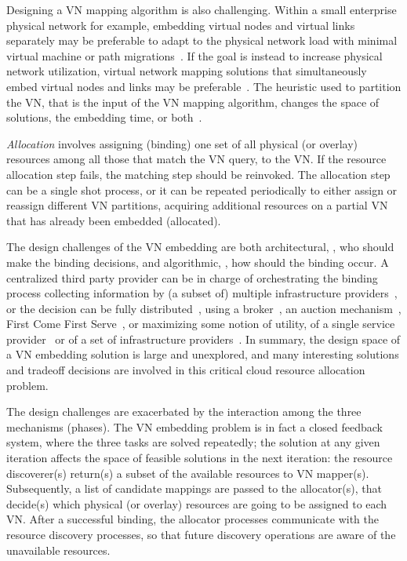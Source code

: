 \documentclass[a4paper, 10pt, conference]{ieeeconf}
\begin{document}
Designing a VN mapping algorithm is also challenging. Within a small enterprise physical network for example, embedding virtual nodes and virtual links separately may be preferable to adapt to the physical network load with minimal virtual machine or path migrations~\cite{pathsplitting}. If the goal is instead to increase physical network utilization, virtual network mapping solutions that simultaneously embed virtual nodes and links may be preferable~\cite{ChowdhuryTON,isomorphism-visa09}. The heuristic used to partition the VN, that is the  input of the VN mapping algorithm, changes the space of solutions, the embedding time, or both~\cite{myPhDThesisTR}.



{\it Allocation} involves assigning (binding) one set of all physical (or overlay) resources among all those that match the VN query, to the VN.  If the resource allocation step fails, the matching step should be reinvoked. 
The allocation step can be a single shot process, or it can be repeated periodically to either assign or reassign different VN partitions, acquiring additional resources on a partial VN that has already been embedded (allocated).

The design challenges of the VN embedding are both architectural, , who should make the binding decisions, and algorithmic, , how should the binding occur.
A centralized third party provider can be in charge of orchestrating the binding process collecting information by (a subset of) multiple infrastructure providers~\cite{Houidi2011,cabernet,Polyvine,pathsplitting}, or the decision can be fully distributed~\cite{CAD,Houidi-distributedVNM,V-Mart}, using a broker~\cite{SHARP}, an auction mechanism~\cite{V-Mart}, First Come First Serve~\cite{sword-journal}, or maximizing some notion of utility, of a single service provider~\cite{pathsplitting} or of a set of infrastructure providers~\cite{CAD}. 
In summary, the design space of a VN embedding solution is large and unexplored, and many interesting solutions and tradeoff decisions are involved in this critical cloud resource allocation problem.

The design challenges are exacerbated by the interaction among the three mechanisms (phases).
The VN embedding problem is in fact a closed feedback system, where the three tasks are solved repeatedly; the solution at any given iteration affects the space of feasible solutions in the next iteration: the resource discoverer(s) return(s) a subset of the available resources to VN mapper(s). Subsequently, a list of candidate mappings are passed to the allocator(s), that decide(s) which physical (or overlay) resources are going to be assigned to each VN. After a successful binding, the allocator processes communicate with the resource discovery processes, so that future discovery operations are aware of the unavailable resources.  
\end{document}
